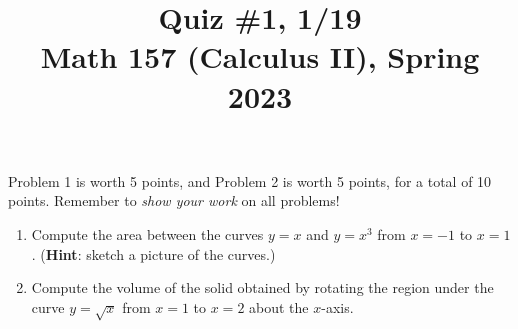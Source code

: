 \documentclass[11pt]{article}
\title{Quiz \#1, 1/19 \\ Math 157 (Calculus II), Spring 2023}
\date{}
\begin{document}
\maketitle

\thispagestyle{empty}

\vspace{-2cm}

Problem 1 is worth 5 points, and Problem 2 is worth 5 points, for a total of 10 points. Remember to \emph{show your work} on all problems!

\begin{enumerate}
\item Compute the area between the curves $y=x$ and $y=x^3$ from $x=-1$ to $x=1$. ({\bf Hint}: sketch a picture of the curves.)

\vspace{8cm}

\item Compute the volume of the solid obtained by rotating the region under the curve $y=\sqrt{x}$ from $x=1$ to $x=2$ about the $x$-axis.

\end{enumerate}
\end{document}
